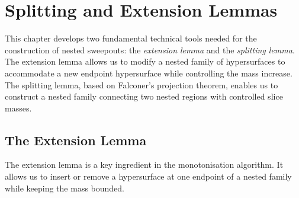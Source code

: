 \chapter{Splitting and Extension Lemmas}\label{ch:splitting-and-extension}
This chapter develops two fundamental technical tools needed for the construction of nested sweepouts: the \emph{extension lemma} and the \emph{splitting lemma}. The extension lemma allows us to modify a nested family of hypersurfaces to accommodate a new endpoint hypersurface while controlling the mass increase. The splitting lemma, based on Falconer's projection theorem, enables us to construct a nested family connecting two nested regions with controlled slice masses.

\section{The Extension Lemma}\label{sec:extension-lemma}
The extension lemma is a key ingredient in the monotonisation algorithm. It allows us to insert or remove a hypersurface at one endpoint of a nested family while keeping the mass bounded.

